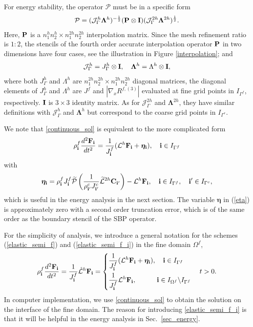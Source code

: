 For energy stability, the operator ${\mathcal{P}}$ must be in a specific form
\[{\mathcal{P}} = (\mathcal{J}^h_\Gamma \bm{\Lambda}^h)^{-\frac{1}{2}}({\bf P}\otimes{\bf I})(\mathcal{J}^{2h}_\Gamma \bm{\Lambda}^{2h})^{\frac{1}{2}}.\]
Here, ${\bf P}$ is a $n_1^hn_2^h\times n_1^{2h}n_2^{2h}$ interpolation matrix. Since the mesh refinement ratio is $1:2$, the stencils of the fourth order accurate interpolation operator ${\bf P}$ in two dimensions have four cases, see the illustration in  Figure \ref{interpolation}; and 
\[\mathcal{J}_{\Gamma}^h = J^{h}_{\Gamma} \otimes {\bf I},\quad {\bm{\Lambda}^h} = \Lambda^h\otimes {\bf I},\]
where both $J_{\Gamma}^h$ and $\Lambda^h$ are $n_1^{2h}n_2^{2h}\times n_1^{2h}n_2^{2h}$ diagonal matrices, the diagonal elements of $J_{\Gamma}^h$ and $\Lambda^{h}$ are $J^f$ and $|\nabla_x R^{f,(3)}|$ evaluated at fine grid points in $I_{\Gamma^f}$, respectively. ${\bf I}$ is $3\times 3$ identity matrix. As for $\mathcal{J}_{\Gamma}^{2h}$ and ${\bm{\Lambda}^{2h}}$, they have similar definitions with $\mathcal{J}_{\Gamma}^{h}$ and ${\bm{\Lambda}^{h}}$ but correspond to the coarse grid points in $I_{\Gamma^c}$.

We note that \eqref{continuous_sol} is equivalent to the more complicated form
\begin{equation}\label{elastic_semi_f_i}
{\rho}^f_{\bf i} \frac{d^2{\bf F}_{\bf i}}{dt^2} =
\frac{1}{J^f_{\bf i}}(\mathcal{L}^h{\bf F}_{\bf i} + {\bm \eta}_{\bf i}), \quad {\bf i}\in I_{\Gamma^f}
\end{equation}
with 
\begin{equation}\label{eta}
{\bm \eta}_{\bf i} = {\rho}^f_{\bf i}J^f_{\bf i}\wt{\mathcal{P}}\left(\frac{1}{\rho^c_{{\bf i}'}J^c_{{\bf i}'}}\wt{\mathcal{L}}^{2h} {\bf C}_{{\bf i}'}\right) - \mathcal{L}^{h}{\bf F}_{\bf i}, \quad {\bf i}\in I_{\Gamma^f},\quad {{\bf i}'}\in I_{\Gamma^c},
\end{equation}
which is useful in the energy analysis in the next section. The variable $\bm \eta$ in (\ref{eta}) is approximately zero with a second order truncation error, which is of the same order as the boundary stencil of the SBP operator. %

For the simplicity of analysis, we introduce a general notation for the schemes (\ref{elastic_semi_f}) and (\ref{elastic_semi_f_i}) in the fine domain $\Omega^f$,
\begin{align}\label{fine_scheme}
{\rho}^f_{\bf i}\frac{d^2{\bf F}_{\bf i}}{dt^2} =\frac{1}{J^f_{\bf i}}\hat{\mathcal{L}}^h{\bf F}_{\bf i} = \left\{
\begin{aligned}
&\frac{1}{J^f_{\bf i}}(\mathcal{L}^h{\bf F}_{\bf i} +{\bm \eta}_{\bf i}), \quad {\bf i}\in I_{\Gamma^f}\\
&\frac{1}{J^f_{\bf i}}\mathcal{L}^h{\bf F}_{\bf i},\quad\quad\quad {\bf i}\in I_{\Omega^f}\backslash I_{\Gamma^f} 
\end{aligned}
\right. \quad t > 0.
\end{align}
In computer implementation, we use \eqref{continuous_sol} to obtain the solution on the interface of the fine domain. The reason for introducing    \eqref{elastic_semi_f_i} is that it will be helpful in the energy analysis in Sec.~\ref{sec_energy}.

